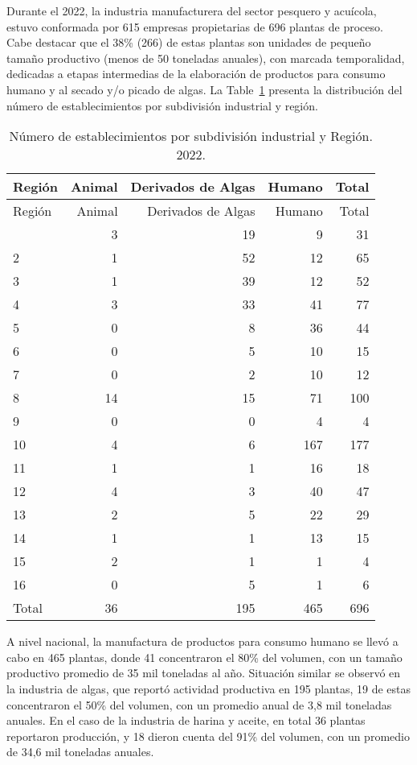 \documentclass[
  super,
  preprint,
  3p]{elsarticle}
\begin{document}
Durante el 2022, la industria manufacturera del sector pesquero y
acuícola, estuvo conformada por 615 empresas propietarias de 696 plantas
de proceso. Cabe destacar que el 38\% (266) de estas plantas son
unidades de pequeño tamaño productivo (menos de 50 toneladas anuales),
con marcada temporalidad, dedicadas a etapas intermedias de la
elaboración de productos para consumo humano y al secado y/o picado de
algas. La Table~\ref{tbl-b} presenta la distribución del número de
establecimientos por subdivisión industrial y región.

\hypertarget{tbl-b}{}
\begin{longtable}[]{@{}lrrrr@{}}
\caption{\label{tbl-b}Número de establecimientos por subdivisión
industrial y Región. 2022.}\tabularnewline
\toprule\noalign{}
Región & Animal & Derivados de Algas & Humano & Total \\
\midrule\noalign{}
\endfirsthead
\toprule\noalign{}
Región & Animal & Derivados de Algas & Humano & Total \\
\midrule\noalign{}
\endhead
\bottomrule\noalign{}
\endlastfoot
1 & 3 & 19 & 9 & 31 \\
2 & 1 & 52 & 12 & 65 \\
3 & 1 & 39 & 12 & 52 \\
4 & 3 & 33 & 41 & 77 \\
5 & 0 & 8 & 36 & 44 \\
6 & 0 & 5 & 10 & 15 \\
7 & 0 & 2 & 10 & 12 \\
8 & 14 & 15 & 71 & 100 \\
9 & 0 & 0 & 4 & 4 \\
10 & 4 & 6 & 167 & 177 \\
11 & 1 & 1 & 16 & 18 \\
12 & 4 & 3 & 40 & 47 \\
13 & 2 & 5 & 22 & 29 \\
14 & 1 & 1 & 13 & 15 \\
15 & 2 & 1 & 1 & 4 \\
16 & 0 & 5 & 1 & 6 \\
Total & 36 & 195 & 465 & 696 \\
\end{longtable}

A nivel nacional, la manufactura de productos para consumo humano se
llevó a cabo en 465 plantas, donde 41 concentraron el 80\% del volumen,
con un tamaño productivo promedio de 35 mil toneladas al año. Situación
similar se observó en la industria de algas, que reportó actividad
productiva en 195 plantas, 19 de estas concentraron el 50\% del volumen,
con un promedio anual de 3,8 mil toneladas anuales. En el caso de la
industria de harina y aceite, en total 36 plantas reportaron producción,
y 18 dieron cuenta del 91\% del volumen, con un promedio de 34,6 mil
toneladas anuales.
\end{document}
